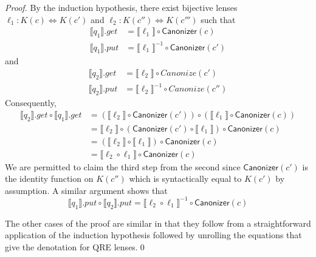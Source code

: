 \documentclass[acmsmall,review,anonymous]{acmart}\settopmatter{printfolios=true,printccs=false,printacmref=false}
\newcommand{\kw}[1]{\ensuremath{\mathsf{#1}}}
\newcommand{\canonizer}{\ensuremath{\kw{Canonizer}}}
\begin{document}
\begin{proof}
By the induction hypothesis, there exist bijective lenses
$\ell_1 :
K(c) \Leftrightarrow K(c')$ and $\ell_2 : K(c'') \Leftrightarrow K(c''')$ such
that
\begin{align*}
\llbracket q_1 \rrbracket.get &= \llbracket \ell_1 \rrbracket \circ
\canonizer(c)\\
\llbracket q_1 \rrbracket.put &= {\llbracket \ell_1 \rrbracket}^{-1} \circ
\canonizer(c')
\end{align*}
and
\begin{align*}
\llbracket q_2 \rrbracket.get &= \llbracket \ell_2 \rrbracket \circ
Canonize(c')\\
\llbracket q_2 \rrbracket.put &= {\llbracket \ell_2 \rrbracket}^{-1} \circ
Canonize(c'')
\end{align*}
Consequently,
\begin{align*}
\llbracket q_2 \rrbracket.get \circ \llbracket q_1 \rrbracket.get &=
(\llbracket \ell_2 \rrbracket \circ \canonizer(c')) \circ (\llbracket \ell_1
\rrbracket \circ \canonizer(c))\\
&= \llbracket \ell_2 \rrbracket \circ (\canonizer(c') \circ \llbracket \ell_1
\rrbracket) \circ \canonizer(c)\\
&= (\llbracket \ell_2 \rrbracket \circ \llbracket \ell_1 \rrbracket) \circ
\canonizer(c)\\
&= \llbracket \ell_2  \circ  \ell_1 \rrbracket \circ
\canonizer(c)
\end{align*}
We are permitted to claim the third step from the second since
$\canonizer(c')$ is the identity function on $K(c'')$ which is
syntactically equal to $K(c')$ by assumption. A similar argument shows that
$$\llbracket q_1 \rrbracket.put \circ \llbracket q_2 \rrbracket.put =
\llbracket \ell_2  \circ  \ell_1 \rrbracket^{-1} \circ
\canonizer(c)$$

The other cases of the proof are similar in that they follow from a
straightforward application of the induction hypothesis followed by unrolling
the equations that give the denotation for QRE lenses.\qed
\end{proof}
\iffalse
\end{document}
